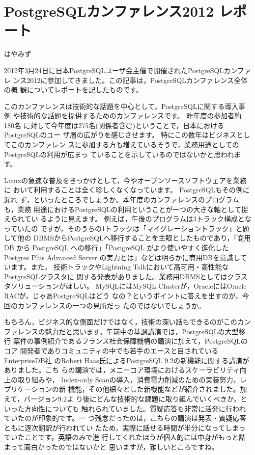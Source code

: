
\chapter{PostgreSQLカンファレンス2012 レポート}

\begin{flushright}
 {\headfont はやみず}
\end{flushright}

2012年3月24日に日本PostgreSQLユーザ会主催で開催されたPostgreSQLカンファレ
ンス2012に参加してきました。この記事は，PostgreSQLカンファレンス全体の概
観についてレポートを記したものです。

このカンファレンスは技術的な話題を中心として，PostgreSQLに関する導入事例
や技術的な話題を提供するためのカンファレンスです。 昨年度の参加者約180名
に対して今年度は275名(関係者含む)ということで，日本におけるPostgreSQLのユー
ザ層の広がりを感じさせます。 特にこの数年はビジネスとしてこのカンファレン
スに参加する方も増えているそうで，業務用途としてのPostgreSQLの利用が広まっ
ていることを示しているのではないかと思われます。

Linuxの急速な普及をきっかけとして，今やオープンソースソフトウェアを業務に
おいて利用することは全く珍しくなくなっています。 PostgreSQLもその例に漏れ
ず，といったところでしょうか。本年度のカンファレンスのプログラムも，業務
用途におけるPostgreSQLの利用ということが一つの大きな軸として捉えられてい
るように見えます。 例えば，午後のプログラムは3トラック構成となっていたの
ですが，そのうちの1トラックは「マイグレーショントラック」と題して他の
DBMSからPostgreSQLへ移行することを主眼としたものであり，「商用 DB から
PostgreSQL への移行」「PostgreSQL がより使いやすく進化した Postgres Plus
Advanced Server の実力とは」などは明らかに商用DBを意識しています。また，
技術トラックやLightning Talkにおいて高可用・高性能なPostgreSQLクラスタに
関する発表がありました。業務用DBMSとしてはクラスタソリューションがほしい。
MySQLにはMySQL Clusterが，OracleにはOracle RACが，じゃあPostgreSQLはどう
なの？というポイントに答えを出すのが，今回のカンファレンスの一つの見所だっ
たのではないでしょうか。

もちろん，ビジネス的な側面だけではなく，技術の深い話もできるのがこのカン
ファレンスの魅力だと思います。午前中の基調講演では，PostgreSQLの大型移行
案件の事例紹介であるフランス社会保障機構の講演に加えて，PostgreSQLのコア
開発者でありコミュニティの中でも若手のエースと目されているEnterpriseDB社
のRobert Haas氏によるPostgreSQL 9.2の新機能に関する講演がありました。こち
らの講演では，メニーコア環境におけるスケーラビリティ向上の取り組みや，
Index-only Scanの導入，消費電力削減のための実装努力，レプリケーションの新
機能，その他細々とした新機能などが紹介されました。加えて，バージョン9.2よ
り後にどんな技術的な課題に取り組んでいくべきか，といった方向性についても
触れられていました。質疑応答も非常に活発に行われていたのが印象的です。一
つ残念だったのは，こちらの講演は発表・質疑応答ともに逐次翻訳が行われてい
たため，実際に話せる時間が半分になってしまっていたことです。英語のみで進
行してくれたほうが個人的には中身がもっと詰まって面白かったのではないかと
思いますが，難しいところですね。


